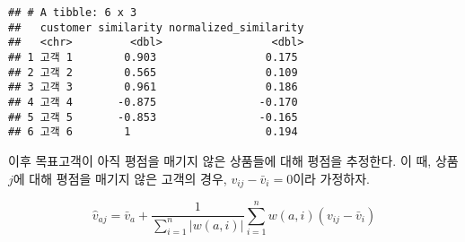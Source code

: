 \documentclass[]{book}
\newenvironment{Shaded}{\begin{snugshade}}{\end{snugshade}}
\newcommand{\DataTypeTok}[1]{\textcolor[rgb]{0.13,0.29,0.53}{#1}}
\newcommand{\KeywordTok}[1]{\textcolor[rgb]{0.13,0.29,0.53}{\textbf{#1}}}
\newcommand{\NormalTok}[1]{#1}
\newcommand{\OperatorTok}[1]{\textcolor[rgb]{0.81,0.36,0.00}{\textbf{#1}}}
\newcommand{\StringTok}[1]{\textcolor[rgb]{0.31,0.60,0.02}{#1}}
\begin{document}
\begin{verbatim}
## # A tibble: 6 x 3
##   customer similarity normalized_similarity
##   <chr>         <dbl>                 <dbl>
## 1 고객 1        0.903                 0.175
## 2 고객 2        0.565                 0.109
## 3 고객 3        0.961                 0.186
## 4 고객 4       -0.875                -0.170
## 5 고객 5       -0.853                -0.165
## 6 고객 6        1                     0.194
\end{verbatim}

이후 목표고객이 아직 평점을 매기지 않은 상품들에 대해 평점을 추정한다. 이 때, 상품 \(j\)에 대해 평점을 매기지 않은 고객의 경우, \(v_{ij} - \bar{v}_i = 0\)이라 가정하자.

\begin{equation*}
\hat{v}_{aj} = \bar{v}_a + \frac{1}{\sum_{i = 1}^{n} \left| w(a, i) \right|} \sum_{i = 1}^{n} w(a, i) (v_{ij} - \bar{v}_i)
\end{equation*}

\begin{Shaded}
\end{Shaded}
\end{document}
